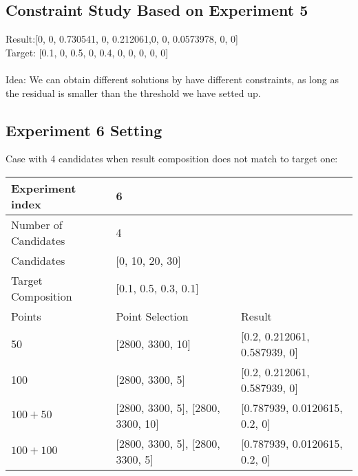 \subsection{Constraint Study Based on Experiment 5}
Result:[0, 0, 0.730541, 0, 0.212061,0, 0, 0.0573978, 0, 0]\\
Target: [0.1, 0, 0.5, 0, 0.4, 0, 0, 0, 0, 0]\\
\\
Idea: We can obtain different solutions by have different constraints, as long as the residual is smaller than the threshold we have setted up. 





\subsection{Experiment 6 Setting}
Case with 4 candidates when result composition does not match to target one: 
\begin{table} \small
\begin{tabular}{l | p{3cm} | l}
\hline
Experiment index & 6  \\
\hline
Number of Candidates & 4   \\
\hline
Candidates & [0, 10, 20, 30]  \\
\hline
Target Composition & [0.1, 0.5, 0.3, 0.1] \\
\hline
\hline
	Points & Point Selection & Result \\ \hline
	50 & [2800, 3300, 10] & [0.2, 0.212061, 0.587939, 0] \\ \hline
	100 & [2800, 3300, 5] & [0.2, 0.212061, 0.587939, 0] \\ \hline
	$100 + 50$ & [2800, 3300, 5], [2800, 3300, 10] & [0.787939, 0.0120615, 0.2, 0]\\ \hline
	$100 + 100$ & [2800, 3300, 5], [2800, 3300, 5] & [0.787939, 0.0120615, 0.2, 0] \\ 
\hline
\end{tabular} \\
\end{table}



